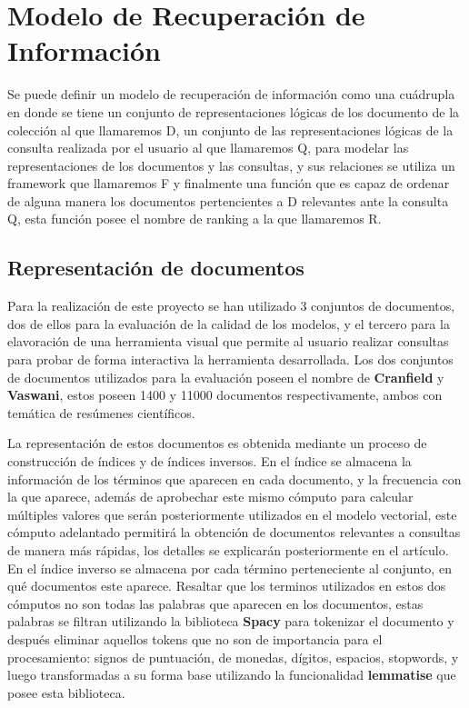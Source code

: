 \documentclass{llncs}
\begin{document}
\section{Modelo de Recuperación de Información}

Se puede definir un modelo de recuperación de información como una cuádrupla en donde se tiene un conjunto de representaciones lógicas de los documento de la colección al que llamaremos D, un conjunto de las representaciones lógicas de la consulta realizada por el usuario al que llamaremos Q, para modelar las representaciones de los documentos y las consultas, y sus relaciones se utiliza un framework que llamaremos F y finalmente una función que es capaz de ordenar de alguna manera los documentos pertencientes a D relevantes ante la consulta Q, esta función posee el nombre de ranking a la que llamaremos R.

\subsection{Representación de documentos}

Para la realización de este proyecto se han utilizado 3 conjuntos de documentos, dos de ellos para la evaluación de la calidad de los modelos, y el tercero para la elavoración de una herramienta visual que permite al usuario realizar consultas para probar de forma interactiva la herramienta desarrollada. Los dos conjuntos de documentos utilizados para la evaluación poseen el nombre de {\bfseries Cranfield} y {\bfseries Vaswani}, estos poseen 1400 y 11000 documentos respectivamente, ambos con temática de resúmenes científicos.

La representación de estos documentos es obtenida mediante un proceso de construcción de índices y de índices inversos. En el índice se almacena la información de los términos que aparecen en cada documento, y la frecuencia con la que aparece, además de aprobechar este mismo cómputo para calcular múltiples valores que serán posteriormente utilizados en el modelo vectorial, este cómputo adelantado permitirá la obtención de documentos relevantes a consultas de manera más rápidas, los detalles se explicarán posteriormente en el artículo. En el índice inverso se almacena por cada término perteneciente al conjunto, en qué documentos este aparece. Resaltar que los terminos utilizados en estos dos cómputos no son todas las palabras que aparecen en los documentos, estas palabras se filtran utilizando la biblioteca {\bfseries Spacy} para tokenizar el documento y después eliminar aquellos tokens que no son de importancia para el procesamiento: signos de puntuación, de monedas, dígitos, espacios, stopwords, y luego transformadas a su forma base utilizando la funcionalidad {\bfseries lemmatise} que posee esta biblioteca.
\end{document}
